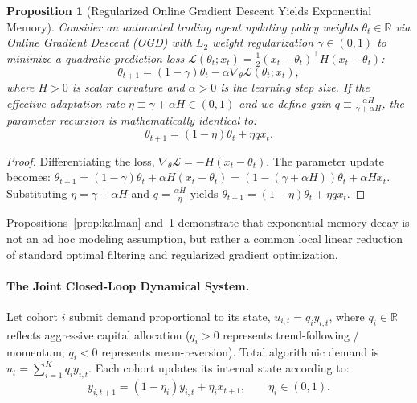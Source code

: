 \documentclass[12pt]{article}
\newtheorem{proposition}[theorem]{Proposition}
\theoremstyle{definition}
\theoremstyle{remark}
\newcommand{\R}{\mathbb{R}}
\begin{document}
\begin{proposition}[Regularized Online Gradient Descent Yields Exponential Memory]
\label{prop:ogd}
Consider an automated trading agent updating policy weights $\theta_t \in \R$ via Online Gradient Descent (OGD) with $L_2$ weight regularization $\gamma \in (0, 1)$ to minimize a quadratic prediction loss $\mathcal{L}(\theta_t; x_t) = \frac{1}{2} (x_t - \theta_t)^\top H (x_t - \theta_t)$:
\begin{equation}
\theta_{t+1} = (1 - \gamma) \theta_t - \alpha \nabla_\theta \mathcal{L}(\theta_t; x_t),
\end{equation}
where $H>0$ is scalar curvature and $\alpha>0$ is the learning step size. If the effective adaptation rate $\eta \equiv \gamma + \alpha H \in (0, 1)$ and we define gain $q \equiv \frac{\alpha H}{\gamma + \alpha H}$, the parameter recursion is mathematically identical to:
\begin{equation}
\theta_{t+1} = (1 - \eta) \theta_t + \eta q x_t.
\end{equation}
\end{proposition}

\begin{proof}
Differentiating the loss, $\nabla_\theta \mathcal{L} = -H(x_t - \theta_t)$. The parameter update becomes:
$\theta_{t+1} = (1 - \gamma)\theta_t + \alpha H (x_t - \theta_t) = (1 - (\gamma + \alpha H))\theta_t + \alpha H x_t$.
Substituting $\eta = \gamma + \alpha H$ and $q = \frac{\alpha H}{\eta}$ yields $\theta_{t+1} = (1 - \eta)\theta_t + \eta q x_t$.
\end{proof}

Propositions~\ref{prop:kalman} and~\ref{prop:ogd} demonstrate that exponential memory decay is not an ad hoc modeling assumption, but rather a common local linear reduction of standard optimal filtering and regularized gradient optimization.

\paragraph{The Joint Closed-Loop Dynamical System.}
Let cohort $i$ submit demand proportional to its state, $u_{i,t} = q_i y_{i,t}$, where $q_i \in \R$ reflects aggressive capital allocation ($q_i > 0$ represents trend-following / momentum; $q_i < 0$ represents mean-reversion). Total algorithmic demand is $u_t = \sum_{i=1}^K q_i y_{i,t}$. Each cohort updates its internal state according to:
\begin{equation}
y_{i, t+1} = (1 - \eta_i) y_{i, t} + \eta_i x_{t+1}, \qquad \eta_i \in (0, 1).
\label{eq:cohort_update}
\end{equation}
\end{document}
